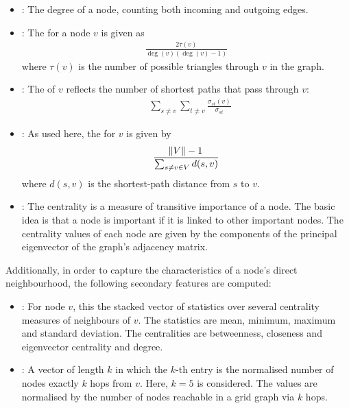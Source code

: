 \documentclass[
	fontsize=10pt, %
	twoside=false, %
	secnumdepth=1, %
  toc=indentunnumbered %
]{kaobook}
\begin{document}
\begin{itemize}
\item {}: The degree of a node, counting both incoming and
  outgoing edges.
\item {}: The 
  \cite{brandes_NetworkAnalysisMethodological_2005}
  for a
  node $v$ is given as
  \begin{align*}
    \frac{2 \tau(v)}{\deg(v)(\deg(v)-1)}
  \end{align*}
  where $\tau(v)$ is the number of possible triangles through $v$ in the graph.
\item {}: The  of $v$
  reflects the number of shortest paths that pass through $v$:
  \begin{align*}
    & \sum_{s \not= v} \sum_{t \not= v} \frac{\sigma_{st}(v)}{\sigma_{st}}
  \end{align*}
\item {}: As used here, the  for $v$ is given by
  \begin{align*}
    \frac{\norm{V}-1}{\sum_{s \not= v \in V} d(s,v)}
  \end{align*}
  where $d(s,v)$ is the shortest-path distance from $s$ to $v$.
\item {}: The  centrality is a
  measure of transitive importance of a node. The basic idea is that a node is
  important if it is linked to other important nodes. The centrality values of
  each node are given by the components of the principal eigenvector of the graph's
  adjacency matrix.
\end{itemize}

Additionally, in order to capture the characteristics of a node's direct
neighbourhood, the following secondary features are computed:
\begin{itemize}
\item {}: For node $v$, this the stacked
  vector of statistics over several centrality measures of neighbours of $v$.
  The statistics are mean, minimum, maximum and standard deviation. The
  centralities are betweenness, closeness and eigenvector centrality and degree.
\item {}: A vector of length $k$ in which the $k$-th
  entry is the normalised number of nodes exactly $k$ hops from $v$. Here, $k=5$
  is considered. The values are normalised by the number of nodes reachable in a
  grid graph via $k$ hops.
\end{itemize}
\end{document}
